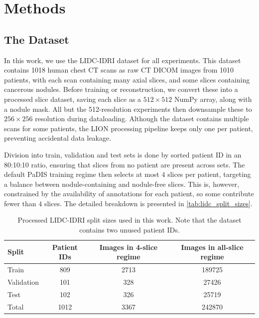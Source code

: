 \ifpdf
    \graphicspath{{Sections/3_methods_figs/Raster/}{Sections/3_methods_figs/PDF/}{Sections/3_methods_figs/}}
\else
    \graphicspath{{Sections/3_methods_figs/Vector/}{Sections/3_methods_figs/}}
\fi

\chapter{Methods}

\section{The Dataset}
In this work, we use the LIDC-IDRI dataset \cite{lidc} for all experiments. This dataset contains 1018 human chest CT scans as raw CT DICOM \cite{DICOM} images from 1010 patients, with each scan containing many axial slices, and some slices containing cancerous nodules. Before training or reconstruction, we convert these into a processed slice dataset, saving each slice as a $512\times 512$ NumPy array, along with a nodule mask. All but the 512-resolution experiments then downsample these to $256\times256$ resolution during dataloading. Although the dataset contains multiple scans for some patients, the LION processing pipeline keeps only one per patient, preventing accidental data leakage.

Division into train, validation and test sets is done by sorted patient ID in an 80:10:10 ratio, ensuring that slices from no patient are present across sets. The default PaDIS training regime then selects at most $4$ slices per patient, targeting a balance between nodule-containing and nodule-free slices. This is, however, constrained by the availability of annotations for each patient, so some contribute fewer than $4$ slices. The detailed breakdown is presented in \autoref{tab:lidc_split_sizes}.

\begin{table}[ht] 
    \centering 
    \begin{tabular}{lccc} 
        \hline \textbf{Split} & \textbf{Patient IDs} & \textbf{Images in 4-slice regime} & \textbf{Images in all-slice regime} \\
        \hline 
        Train & 809 & 2713 & 189725 \\ 
        Validation & 101 & 328 & 27426 \\ 
        Test & 102 & 326 & 25719 \\ 
        \hline Total & 1012 & 3367 & 242870 \\ 
        \hline 
    \end{tabular}
    \caption{Processed LIDC-IDRI split sizes used in this work. Note that the dataset contains two unused patient IDs.}
    \label{tab:lidc_split_sizes} 
\end{table}

